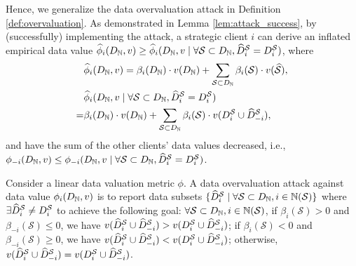 Hence, we generalize the data overvaluation attack in Definition \ref{def:overvaluation}.
As demonstrated in Lemma \ref{lem:attack_success}, by (successfully) implementing the attack, a strategic client $i$ can derive an inflated empirical data value $\widehat{\phi}_{i}(D_{\mathbb{N}}, v) \geq \widehat{\phi}_{i}(D_{\mathbb{N}}, v \mid \forall \mathcal{S} \subset D_{\mathbb{N}}, \widehat{D}^{\mathcal{S}}_{i} =  D^{\mathcal{S}}_{i})$, where
\begin{align*}
    &\widehat{\phi}_{i}(D_{\mathbb{N}}, v) = \beta_i(D_{\mathbb{N}}) \cdot v(D_{\mathbb{N}}) + \sum_{\mathcal{S}\subset D_{\mathbb{N}}} \beta_i(\mathcal{S}) \cdot v(\widehat{\mathcal{S}}),\\
    &\widehat{\phi}_{i}(D_{\mathbb{N}}, v \mid \forall \mathcal{S} \subset D_{\mathbb{N}}, \widehat{D}^{\mathcal{S}}_{i} =  D^{\mathcal{S}}_{i}) \\
    = & \beta_i(D_{\mathbb{N}}) \cdot v(D_{\mathbb{N}}) + \sum_{\mathcal{S}\subset D_{\mathbb{N}}} \beta_i(\mathcal{S}) \cdot v(D^{\mathcal{S}}_{i} \cup \widehat{D}^{\mathcal{S}}_{-i}),
\end{align*}
and have the sum of the other clients' data values decreased, i.e., $\phi_{-i}(D_{\mathbb{N}}, v) \leq \phi_{-i}(D_{\mathbb{N}}, v \mid \forall \mathcal{S} \subset D_{\mathbb{N}}, \widehat{D}^{\mathcal{S}}_{i} =  D^{\mathcal{S}}_{i})$.

\begin{definition}
\label{def:overvaluation}
    Consider a linear data valuation metric $\phi$. 
    A data overvaluation attack against data value $\phi_i(D_{\mathbb{N}}, v)$ is to report data subsets $\{\widehat{D}^{\mathcal{S}}_{i} \mid \forall \mathcal{S} \subset D_{\mathbb{N}}, i\in \mathbb{N}(\mathcal{S}) \}$ where $\exists \widehat{D}^{\mathcal{S}}_{i} \neq D^{\mathcal{S}}_{i}$ to achieve the following goal: $\forall \mathcal{S} \subset D_{\mathbb{N}}, i \in \mathbb{N}(\mathcal{S})$, if $\beta_i(\mathcal{S}) > 0$ and $\beta_{-i}(\mathcal{S}) \leq 0$, we have $v(\widehat{D}^{\mathcal{S}}_{i}\cup \widehat{D}^{\mathcal{S}}_{-i}) > v(D^{\mathcal{S}}_{i}\cup \widehat{D}^{\mathcal{S}}_{-i})$; if $\beta_i(\mathcal{S}) < 0$ and $\beta_{-i}(\mathcal{S}) \geq 0$, we have $v(\widehat{D}^{\mathcal{S}}_{i}\cup \widehat{D}^{\mathcal{S}}_{-i}) < v(D^{\mathcal{S}}_{i}\cup \widehat{D}^{\mathcal{S}}_{-i})$; otherwise, $v(\widehat{D}^{\mathcal{S}}_{i}\cup \widehat{D}^{\mathcal{S}}_{-i}) = v(D^{\mathcal{S}}_{i}\cup \widehat{D}^{\mathcal{S}}_{-i})$.
\end{definition}

